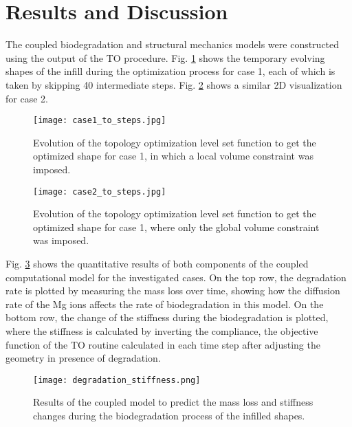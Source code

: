 \section{Results and Discussion}\label{section:infill_results}

The coupled biodegradation and structural mechanics models were constructed using the output of the TO procedure. Fig. \ref{fig:infill_case1_to_steps} shows the temporary evolving shapes of the infill during the optimization process for case 1, each of which is taken by skipping 40 intermediate steps. Fig. \ref{fig:infill_case2_to_steps} shows a similar 2D visualization for case 2.


\begin{figure}[h]
\centering
\medskip
\texttt{[image: case1\_to\_steps.jpg]}
\caption[Evolution of the topology optimization level set function for case 1]{Evolution of the topology optimization level set function to get the optimized shape for case 1, in which a local volume constraint was imposed.} \label{fig:infill_case1_to_steps}
\end{figure}

\begin{figure}[h]
\centering
\medskip
\texttt{[image: case2\_to\_steps.jpg]}
\caption[Evolution of the topology optimization level set function for case 2]{Evolution of the topology optimization level set function to get the optimized shape for case 1, where only the global volume constraint was imposed.} \label{fig:infill_case2_to_steps}
\end{figure}

Fig. \ref{fig:infill_degradation_stiffness} shows the quantitative results of both components of the coupled computational model for the investigated cases. On the top row, the degradation rate is plotted by measuring the mass loss over time, showing how the diffusion rate of the Mg ions affects the rate of biodegradation in this model. On the bottom row, the change of the stiffness during the biodegradation is plotted, where the stiffness is calculated by inverting the compliance, the objective function of the TO routine calculated in each time step after adjusting the geometry in presence of degradation.


\begin{figure}[h]
\centering
\medskip
\texttt{[image: degradation\_stiffness.png]}
\caption[Results of the coupled model to predict the stiffness changes during biodegradation]{Results of the coupled model to predict the mass loss and stiffness changes during the biodegradation process of the infilled shapes.} \label{fig:infill_degradation_stiffness}
\end{figure}

